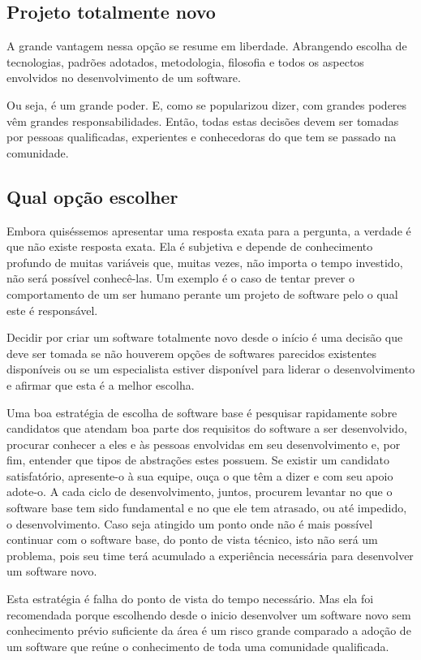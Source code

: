 \documentclass[12pt]{article}
\begin{document}
  \subsection{Projeto totalmente novo} \label{subsec:projeto-novo}
  A grande vantagem nessa opção se resume em liberdade. Abrangendo escolha de tecnologias, padrões adotados, metodologia, filosofia e todos os aspectos envolvidos no desenvolvimento de um software.

  Ou seja, é um grande poder. E, como se popularizou dizer, com grandes poderes vêm grandes responsabilidades. Então, todas estas decisões devem ser tomadas por pessoas qualificadas, experientes e conhecedoras do que tem se passado na comunidade.

  \subsection{Qual opção escolher} \label{subsec:qualopcaoescolher}
  Embora quiséssemos apresentar uma resposta exata para a pergunta, a verdade é que não existe resposta exata. Ela é subjetiva e depende de conhecimento profundo de muitas variáveis que, muitas vezes, não importa o tempo investido, não será possível conhecê-las. Um exemplo é o caso de tentar prever o comportamento de um ser humano perante um projeto de software pelo o qual este é responsável.

  Decidir por criar um software totalmente novo desde o início é uma decisão que deve ser tomada se não houverem opções de softwares parecidos existentes disponíveis ou se um especialista estiver disponível para liderar o desenvolvimento e afirmar que esta é a melhor escolha.

  Uma boa estratégia de escolha de software base é pesquisar rapidamente sobre candidatos que atendam boa parte dos requisitos do software a ser desenvolvido, procurar conhecer a eles e às pessoas envolvidas em seu desenvolvimento e, por fim, entender que tipos de abstrações estes possuem. Se existir um candidato satisfatório, apresente-o à sua equipe, ouça o que têm a dizer e com seu apoio adote-o. A cada ciclo de desenvolvimento, juntos, procurem levantar no que o software base tem sido fundamental e no que ele tem atrasado, ou até impedido, o desenvolvimento. Caso seja atingido um ponto onde não é mais possível continuar com o software base, do ponto de vista técnico, isto não será um problema, pois seu time terá acumulado a experiência necessária para desenvolver um software novo.

  Esta estratégia é falha do ponto de vista do tempo necessário. Mas ela foi recomendada porque escolhendo desde o inicio desenvolver um software novo sem conhecimento prévio suficiente da área é um risco grande comparado a adoção de um software que reúne o conhecimento de toda uma comunidade qualificada.
\end{document}
